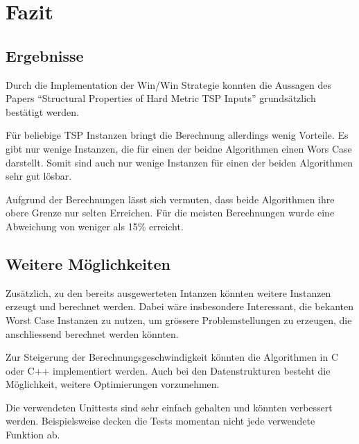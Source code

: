 \documentclass[11pt,a4paper]{article}
\begin{document}
\section{Fazit}
\subsection{Ergebnisse}
Durch die Implementation der Win/Win Strategie konnten die Aussagen des Papers "`Structural Properties of Hard Metric TSP Inputs"'\cite{moemke11} grundsätzlich bestätigt werden. 

Für beliebige TSP Instanzen bringt die Berechnung allerdings wenig Vorteile. Es gibt nur wenige Instanzen, die für einen der beidne Algorithmen einen Wors Case darstellt. Somit sind auch nur wenige Instanzen für einen der beiden Algorithmen sehr gut lösbar.

Aufgrund der Berechnungen lässt sich vermuten, dass beide Algorithmen ihre obere Grenze nur selten Erreichen. Für die meisten Berechnungen wurde eine Abweichung von weniger als 15\% erreicht.

\subsection{Weitere Möglichkeiten}
Zusätzlich, zu den bereits ausgewerteten Intanzen könnten weitere Instanzen erzeugt und berechnet werden. Dabei wäre insbesondere Interessant, die bekanten Worst Case Instanzen zu nutzen, um grössere Problemstellungen zu erzeugen, die anschliessend berechnet werden könnten.

Zur Steigerung der Berechnungsgeschwindigkeit könnten die Algorithmen in C oder C++ implementiert werden. Auch bei den Datenstrukturen besteht die Möglichkeit, weitere Optimierungen vorzunehmen.

Die verwendeten Unittests sind sehr einfach gehalten und könnten verbessert werden. Beispielsweise decken die Tests momentan nicht jede verwendete Funktion ab.

\newpage



\end{document}
